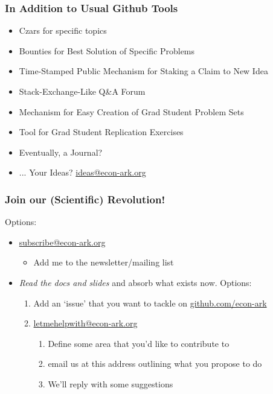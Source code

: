 \documentclass[public]{beamer}
\providecommand{\ARK}{\href{http://github.com/econ-ark}{github.com/econ-ark}}
\begin{document}
\begin{frame}
\frametitle{In Addition to Usual Github Tools}

\begin{itemize}
\item Czars for specific topics
\item Bounties for Best Solution of Specific Problems
\item Time-Stamped Public Mechanism for Staking a Claim to New Idea
\item Stack-Exchange-Like Q\&A Forum
\item Mechanism for Easy Creation of Grad Student Problem Sets
\item Tool for Grad Student Replication Exercises
\item Eventually, a Journal?
\item ... Your Ideas?  \href{mailto:ideas@econ-ark.org}{ideas@econ-ark.org}
\end{itemize}

\end{frame}

\begin{frame}
\frametitle{Join our (Scientific) Revolution!}

\providecommand{\subscribe}{\href{mailto:subscribe@econ-ark.org}{subscribe@econ-ark.org}}
\providecommand{\letmehelpwith}{\href{mailto:letmehelpwith@econ-ark.org}{letmehelpwith@econ-ark.org}}
Options:
\begin{itemize}
\item \subscribe
\begin{itemize}
\item Add me to the newsletter/mailing list
\end{itemize}
\item {\it Read the docs and slides} and absorb what exists now.  Options:
\begin{enumerate}
\item Add an `issue' that you want to tackle on \ARK
\item \letmehelpwith
\begin{enumerate}
\item Define some area that you'd like to contribute to
\item email us at this address outlining what you propose to do
\item We'll reply with some suggestions
\end{enumerate}
\end{enumerate}
\end{itemize}

\end{frame}
\end{document}
